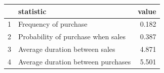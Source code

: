 \begin{tabular}{rlr}
  \hline
 & statistic & value \\ 
  \hline
1 & Frequency of purchase & 0.182 \\ 
  2 & Probability of purchase when sales & 0.387 \\ 
  3 & Average duration between sales & 4.871 \\ 
  4 & Average duration between purchases & 5.501 \\ 
   \hline
\end{tabular}
